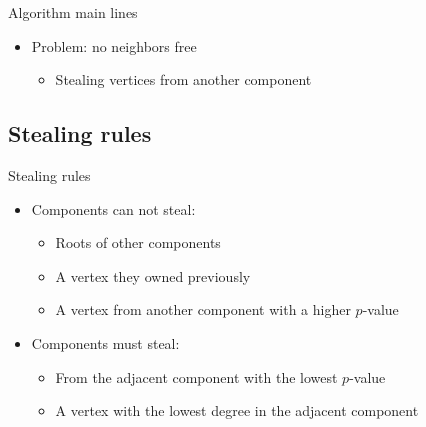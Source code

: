 \begin{frame}{Algorithm main lines}
  \begin{itemize}
  \item Problem: no neighbors free
    \begin{itemize}
    \item Stealing vertices from another component
    \end{itemize}
  \end{itemize}
  \begin{center}
  \end{center}
\end{frame}

\subsection{Stealing rules}

\begin{frame}{Stealing rules}
  \begin{itemize}
  \item Components can not steal:
    \begin{itemize}
    \item Roots of other components
    \item A vertex they owned previously
    \item A vertex from another component with a higher $p$-value
    \end{itemize}
  \item Components must steal:
    \begin{itemize}
    \item From the adjacent component with the lowest $p$-value
    \item A vertex with the lowest degree in the adjacent component
    \end{itemize}
  \end{itemize}
\end{frame}
